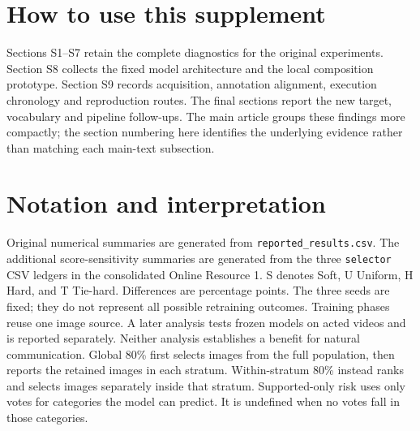 \section*{How to use this supplement}
Sections S1--S7 retain the complete diagnostics for the original experiments. Section S8 collects the fixed model architecture and the local composition prototype. Section S9 records acquisition, annotation alignment, execution chronology and reproduction routes. The final sections report the new target, vocabulary and pipeline follow-ups. The main article groups these findings more compactly; the section numbering here identifies the underlying evidence rather than matching each main-text subsection.

\tableofcontents
\medskip
\section*{Notation and interpretation}
Original numerical summaries are generated from \texttt{reported\_results.csv}. The additional score-sensitivity summaries are generated from the three \texttt{selector} CSV ledgers in the consolidated Online Resource 1.
S denotes Soft, U Uniform, H Hard, and T Tie-hard. Differences are percentage points.
The three seeds are fixed; they do not represent all possible retraining outcomes.
Training phases reuse one image source. A later analysis tests frozen models on acted videos and is reported separately. Neither analysis establishes a benefit for natural communication.
Global 80\% first selects images from the full population, then reports the retained images in each stratum. Within-stratum 80\% instead ranks and selects images separately inside that stratum.
Supported-only risk uses only votes for categories the model can predict. It is undefined when no votes fall in those categories.
